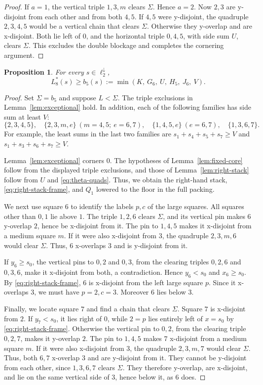 \documentclass[12pt]{amsart}
\newtheorem{proposition}[theorem]{Proposition}
\theoremstyle{definition}
\theoremstyle{remark}
\numberwithin{equation}{section}
\numberwithin{figure}{section}
\numberwithin{table}{section}
\begin{document}
\begin{proof}
If $a=1$, the vertical triple $1,3,m$ clears $\Sigma$. Hence $a=2$.
Now $2,3$ are y-disjoint from each other and from both $4,5$. If $4,5$
were y-disjoint, the quadruple $2,3,4,5$ would be a vertical chain that clears $\Sigma$.
Otherwise they y-overlap and are x-disjoint. Both lie left of
$0$, and the horizontal triple $0,4,5$, with side sum $U$, clears $\Sigma$. This excludes the
double blockage and completes the cornering argument.
\end{proof}

\begin{proposition}\label{prop:ell6}
For every $s\in\ell_2^\downarrow$,
\[
L_8^*(s)\ge b_5(s):=\min(K,\ G_6,\ U,\ H_5,\ J_6,\ V).
\]
\end{proposition}
\begin{proof}
Set $\Sigma=b_5$ and suppose $L<\Sigma$. The triple exclusions in
Lemma~\ref{lem:exceptional} hold. In addition, each of the following families has side sum at least $V$:
\begin{equation}\label{eq:theta-quads}
\{2,3,4,5\},\quad \{2,3,m,e\}\ (m=4,5;\ e=6,7),\quad
\{1,4,5,e\}\ (e=6,7),\quad \{1,3,6,7\}.
\end{equation}
For example, the least sums in the last two families are
$s_1+s_4+s_5+s_7\ge V$ and $s_1+s_3+s_6+s_7\ge V$.

Lemma~\ref{lem:exceptional} corners $0$. The hypotheses of
Lemma~\ref{lem:fixed-core} follow from the displayed triple
exclusions, and those of Lemma~\ref{lem:right-stack} follow from
$U$ and \eqref{eq:theta-quads}. Thus, we obtain the right-hand stack,
\eqref{eq:right-stack-frame}, and $Q_1$ lowered to the floor in the full
packing.

We next use square $6$ to identify the labels $p,c$ of the large squares.
All squares other than $0,1$ lie above $1$. The triple $1,2,6$
clears $\Sigma$, and its vertical pin makes $6$ y-overlap $2$, hence be x-disjoint
from it. The pin to $1,4,5$ makes it x-disjoint from a medium square $m$.
If it were also x-disjoint from $3$, the quadruple $2,3,m,6$ would clear $\Sigma$.
Thus, $6$ x-overlaps $3$ and is y-disjoint from it.

If $y_6\ge s_0$, the vertical pins to $0,2$ and $0,3$, from the clearing triples $0,2,6$
and $0,3,6$, make it x-disjoint from both, a contradiction. Hence $y_6<s_0$ and
$x_6\ge s_0$. By \eqref{eq:right-stack-frame}, $6$ is x-disjoint from the
left large square $p$. Since it x-overlaps $3$, we must have
$p=2,c=3$. Moreover $6$ lies below $3$.

Finally, we locate square $7$ and find a chain that clears $\Sigma$.
Square $7$ is x-disjoint from $2$. If $y_7<s_0$, it lies right of $0$,
while $2=p$ lies entirely left of $x=s_0$ by
\eqref{eq:right-stack-frame}. Otherwise the vertical pin to
$0,2$, from the clearing triple $0,2,7$, makes it y-overlap $2$.
The pin to $1,4,5$ makes $7$ x-disjoint from a medium square $m$.
If it were also x-disjoint from $3$, the quadruple $2,3,m,7$ would clear $\Sigma$.
Thus, both $6,7$ x-overlap $3$ and are y-disjoint from it.
They cannot be y-disjoint from each other, since $1,3,6,7$ clears $\Sigma$.
They therefore y-overlap, are x-disjoint, and lie on the same
vertical side of $3$, hence below it, as $6$ does.


\end{proof}
\end{document}
